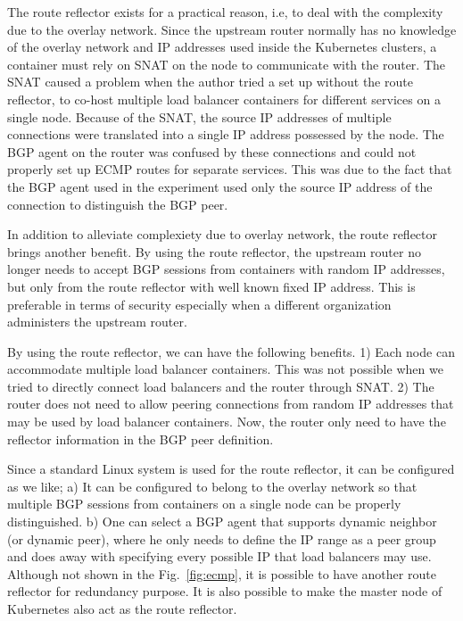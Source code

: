 The route reflector exists for a practical reason, i.e, to deal with the complexity due to the overlay network.
Since the upstream router normally has no knowledge of the overlay network and IP addresses used inside the Kubernetes clusters, a container must rely on SNAT on the node to communicate with the router.
The SNAT caused a problem when the author tried a set up without the route reflector, to co-host multiple load balancer containers for different services on a single node.
Because of the SNAT, the source IP addresses of multiple connections were translated into a single IP address possessed by the node.
The BGP agent on the router was confused by these connections and could not properly set up ECMP routes for separate services.
This was due to the fact that the BGP agent used in the experiment used only the source IP address of the connection to distinguish the BGP peer.

In addition to alleviate complexiety due to overlay network, the route reflector brings another benefit.
By using the route reflector, the upstream router no longer needs to accept BGP sessions from containers with random IP addresses, but only from the route reflector with well known fixed IP address.
This is preferable in terms of security especially when a different organization administers the upstream router.

By using the route reflector, we can have the following benefits.
1) Each node can accommodate multiple load balancer containers. This was not possible when we tried to directly connect load balancers and the router through SNAT.
2) The router does not need to allow peering connections from random IP addresses that may be used by load balancer containers. Now, the router only need to have the reflector information in the BGP peer definition.

Since a standard Linux system is used for the route reflector, it can be configured as we like;
a) It can be configured to belong to the overlay network so that multiple BGP sessions from containers on a single node can be properly distinguished.
b) One can select a BGP agent that supports dynamic neighbor (or dynamic peer), where he only needs to define the IP range as a peer group and does away with specifying every possible IP that load balancers may use.
Although not shown in the Fig.~\ref{fig:ecmp}, it is possible to have another route reflector for redundancy purpose.
It is also possible to make the master node of Kubernetes also act as the route reflector.

\FloatBarrier


